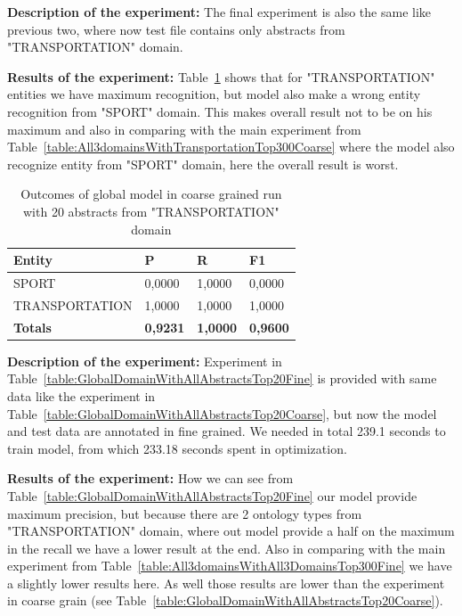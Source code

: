 \documentclass[thesis=M,english]{FITthesis}[2018/05/30]
\begin{document}
\textbf{Description of the experiment:} The final experiment is also the same like previous two, where now test file contains only abstracts from "TRANSPORTATION" domain.

\textbf{Results of the experiment:} Table~\ref{table:GlobalDomainWithTransportationTop20Coarse} shows that for "TRANSPORTATION" entities we have maximum recognition, but model also make a wrong entity recognition from "SPORT" domain. This makes overall result not to be on his maximum and also in comparing with the main experiment from Table~\ref{table:All3domainsWithTransportationTop300Coarse} where the model also recognize entity from "SPORT" domain, here the overall result is worst. 

	\begin{table}[H]\centering
		\begin{tabular}{|l|l|l|l|}
			\hline {\textbf{Entity}} & {\textbf{P}} & {\textbf{R}} & {\textbf{F1}}\\\hline
				SPORT & 0,0000 & 1,0000 & 0,0000\\
				TRANSPORTATION & 1,0000 & 1,0000 & 1,0000\\\hline
				\textbf{Totals} & \textbf{0,9231} & \textbf{1,0000} & \textbf{0,9600}\\\hline
		\end{tabular}
		\caption{Outcomes of global model in coarse grained run with 20 abstracts from "TRANSPORTATION" domain \label{table:GlobalDomainWithTransportationTop20Coarse}}
	\end{table}	

\textbf{Description of the experiment:} Experiment in Table~\ref{table:GlobalDomainWithAllAbstractsTop20Fine} is provided with same data like the experiment in Table~\ref{table:GlobalDomainWithAllAbstractsTop20Coarse}, but now the model and test data are annotated in fine grained. We needed in total 239.1 seconds to train model, from which 233.18 seconds spent in optimization.

\textbf{Results of the experiment:} How we can see from Table~\ref{table:GlobalDomainWithAllAbstractsTop20Fine} our model provide maximum precision, but because there are 2 ontology types from "TRANSPORTATION" domain, where out model provide a half on the maximum in the recall we have a lower result at the end. Also in comparing with the main experiment from Table~\ref{table:All3domainsWithAll3DomainsTop300Fine} we have a slightly lower results here. As well those results are lower than the experiment in coarse grain (see Table~\ref{table:GlobalDomainWithAllAbstractsTop20Coarse}).
\end{document}

